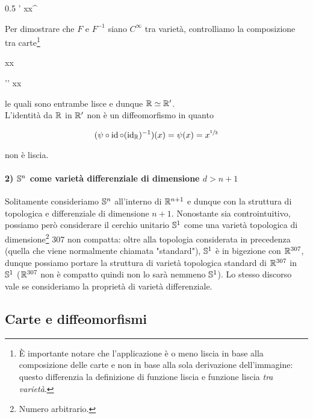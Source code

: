 	{0.5}{%
				{\R'}{\R}
				{x}{x^{}}
			}

Per dimostrare che $ F $ e $ F^{-1} $ siano $ C^{\infty} $ tra varietà, controlliamo la composizione tra carte\footnote{%
	È importante notare che l'applicazione è o meno liscia in base alla composizione delle carte e non in base alla sola derivazione dell'immagine: questo differenzia la definizione di funzione liscia e funzione liscia \textit{tra varietà}.%
}

	{\R}{\R}
	{x}{x}
	
	{\R'}{\R'}
	{x}{x}

le quali sono entrambe lisce e dunque $ \R \simeq \R' $. \\
L'identità da $ \R $ in $ \R' $ non è un diffeomorfismo in quanto

\begin{equation}
	(\psi \circ \id \circ (\id_{\R})^{-1})(x) = \psi(x) = x^{\sfrac{1}{3}}
\end{equation}

non è liscia.

\paragraph{2) $ \S^{n} $ come varietà differenziale di dimensione $ d > n+1 $}

Solitamente consideriamo $ \S^{n} $ all'interno di $ \R^{n+1} $ e dunque con la struttura di topologica e differenziale di dimensione $ n+1 $. Nonostante sia controintuitivo, possiamo però considerare il cerchio unitario $ \S^{1} $ come una varietà topologica di dimensione\footnote{%
	Numero arbitrario.%
} 307 non compatta: oltre alla topologia considerata in precedenza (quella che viene normalmente chiamata "standard"), $ \S^{1} $ è in bigezione con $ \R^{307} $, dunque possiamo portare la struttura di varietà topologica standard di $ \R^{307} $ in $ \S^{1} $ ($ \R^{307} $ non è compatto quindi non lo sarà nemmeno $ \S^{1} $). Lo stesso discorso vale se consideriamo la proprietà di varietà differenziale.

\subsection{Carte e diffeomorfismi}

